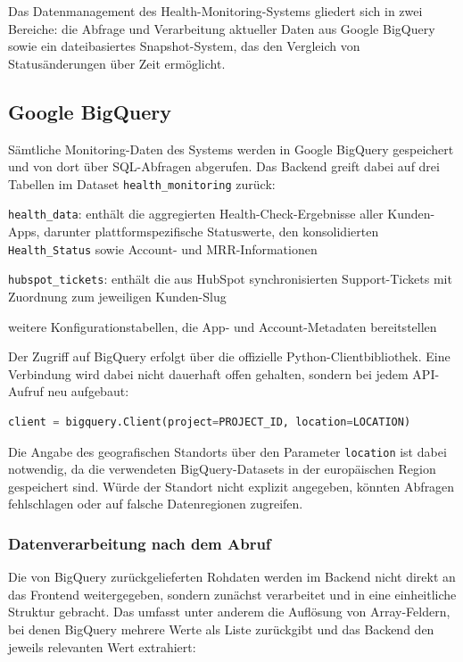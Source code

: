Das Datenmanagement des Health-Monitoring-Systems gliedert sich in zwei Bereiche: die Abfrage und Verarbeitung aktueller Daten aus Google BigQuery sowie ein dateibasiertes Snapshot-System, das den Vergleich von Statusänderungen über Zeit ermöglicht.

\subsection{Google BigQuery}
Sämtliche Monitoring-Daten des Systems werden in Google BigQuery gespeichert und von dort über SQL-Abfragen abgerufen. Das Backend greift dabei auf drei Tabellen im Dataset \texttt{health\_monitoring} zurück:

\begin{compactitem}
\item \texttt{health\_data}: enthält die aggregierten Health-Check-Ergebnisse aller Kunden-Apps, darunter plattformspezifische Statuswerte, den konsolidierten \texttt{Health\_Status} sowie Account- und MRR-Informationen
\item \texttt{hubspot\_tickets}: enthält die aus HubSpot synchronisierten Support-Tickets mit Zuordnung zum jeweiligen Kunden-Slug
\item weitere Konfigurationstabellen, die App- und Account-Metadaten bereitstellen
\end{compactitem}

Der Zugriff auf BigQuery erfolgt über die offizielle Python-Clientbibliothek. Eine Verbindung wird dabei nicht dauerhaft offen gehalten, sondern bei jedem API-Aufruf neu aufgebaut:

\begin{lstlisting}[language=Python, caption={Initialisierung des BigQuery-Clients}, label={lst:bigquery-client}]
client = bigquery.Client(project=PROJECT_ID, location=LOCATION)
\end{lstlisting}

Die Angabe des geografischen Standorts über den Parameter \texttt{location} ist dabei notwendig, da die verwendeten BigQuery-Datasets in der europäischen Region gespeichert sind. Würde der Standort nicht explizit angegeben, könnten Abfragen fehlschlagen oder auf falsche Datenregionen zugreifen.

\subsubsection{Datenverarbeitung nach dem Abruf}
Die von BigQuery zurückgelieferten Rohdaten werden im Backend nicht direkt an das Frontend weitergegeben, sondern zunächst verarbeitet und in eine einheitliche Struktur gebracht. Das umfasst unter anderem die Auflösung von Array-Feldern, bei denen BigQuery mehrere Werte als Liste zurückgibt und das Backend den jeweils relevanten Wert extrahiert:

